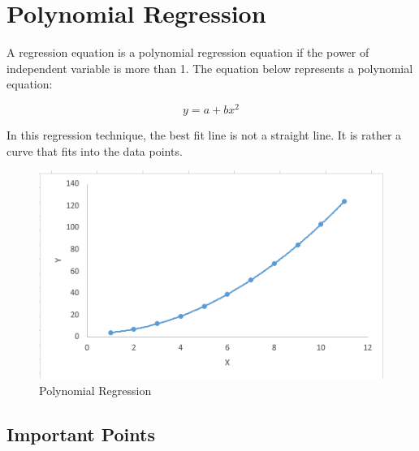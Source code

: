 \documentclass[11pt, a4paper]{report}
\begin{document}
\section{Polynomial Regression}

A regression equation is a polynomial regression equation if the power of independent variable is more than 1. The equation below represents a polynomial equation:

\[ y=a+bx^2 \]

In this regression technique, the best fit line is not a straight line. It is rather a curve that fits into the data points. \cite{desc:RegressionAnalysis}

\begin{figure}[!bth]
	\center
	\includegraphics[scale=0.4]{images/Polynomial.png}
	\caption[Polynomial Regression]{Polynomial Regression \cite{desc:RegressionAnalysis}}
	\label{fig:ploynomialRegression}
\end{figure}

\subsection{Important Points}
\end{document}
